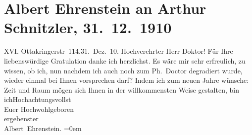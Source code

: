 

               \section[Albert Ehrenstein an Arthur Schnitzler, 31. 12. 1910]{ Albert Ehrenstein an Arthur Schnitzler, 31. 12. 1910}\nopagebreak{}\rehead{ }\begin{ledgroupsized}[t]{13cm}\normalsize\beginnumbering{} \toendnotes[C]{\smallbreak\pagebreak[2]} 
\pstart
           {\pb}XVI. Ottakringerstr 114.\hfill 31. Dez. 10.\pend
           \pstart\center{}Hochverehrter Herr Doktor!\pend\pstart
           Für Ihre liebenswürdige Gratulation danke ich herzlichst.\pend
           \pstart
           Es wäre mir sehr erfreulich, zu wissen, ob ich, nun nachdem ich auch noch zum
                    Ph. Doctor degradiert wurde, wieder einmal bei Ihnen vorsprechen darf?\pend
           \pstart
           Indem ich zum neuen Jahre wünsche: Zeit und Raum mögen sich Ihnen in der
                    willkommensten Weise gestalten,\pend
           \pstart
           bin ich\hspace*{2em}Hochachtungsvollst{\\[\baselineskip]}Euer Hochwohlgeboren{\\[\baselineskip]}ergebenster{\\[\baselineskip]}\spacefill\mbox{Albert Ehrenstein.}\pend
           \leftskip=0em{}          \endnumbering{}\end{ledgroupsized}  \newcommand{\dateiname}{L01997}\newcommand{\titel}{Albert Ehrenstein an Arthur Schnitzler, 31. 12. 1910}\newcommand{\editorInnen}{Martin Anton Müller und Gerd-Hermann Susen}
      
